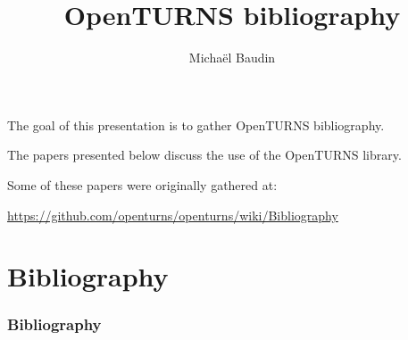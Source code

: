 \documentclass[9pt]{beamer}
\title{OpenTURNS bibliography}
\author[M. Baudin]{Michaël Baudin}
\begin{document}
\frame{\titlepage}

\begin{frame}
The goal of this presentation is to gather OpenTURNS bibliography.

The papers presented below discuss the use of the OpenTURNS library. 

Some of these papers were originally gathered at:

\begin{center}
\url{https://github.com/openturns/openturns/wiki/Bibliography}
\end{center}

\end{frame}


\section{Bibliography}
\begin{frame}[allowframebreaks]
\frametitle{Bibliography}
\nocite{*}


\end{frame}

\end{document}
